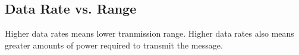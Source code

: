 \subsection{Data Rate vs. Range}\label{subsec:Data_Rate_vs_Range}
Higher data rates means lower tranmission range.
Higher data rates also means greater amounts of power required to transmit the message.


